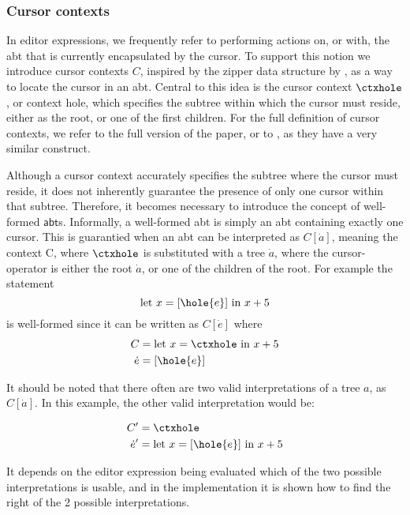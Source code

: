\documentclass[sigplan,review]{acmart}
\newcommand{\abt}{\textsf{abt}\xspace}
\begin{document}
\subsubsection{Cursor contexts}
In editor expressions, we frequently refer to performing actions on, or with, the \abt that is currently encapsulated by the cursor. To support this notion we introduce cursor contexts $C$, inspired by the zipper data structure by \cite{huet_zipper}, as a way to locate the cursor in an \abt. Central to this idea is the cursor context $\ctxhole$, or context hole, which specifies the subtree within which the cursor must reside, either as the root, or one of the first children.  For the full definition of cursor contexts, we refer to the full version of the paper, or to \cite{type_safe_structure_editor}, as they have a very similar construct.

Although a cursor context accurately specifies the subtree where the cursor must reside, it does not inherently guarantee the presence of only one cursor within that subtree. Therefore, it becomes necessary to introduce the concept of well-formed $\abt$s. Informally, a well-formed \abt is simply an \abt containing exactly one cursor. This is guarantied when an \abt can be interpreted as $C[\dot{a}]$, meaning the context C, where $\ctxhole$ is substituted with a tree $\dot{a}$, where the cursor-operator is either the root $\dot{a}$, or one of the children of the root. For example the statement
    \begin{equation*}
        \text{let $x=[\hole{e}]$ in $x+5$}
    \end{equation*}
    is well-formed since it can be written as $C[\dot{e}]$ where
    \begin{align*}
        C &= \text{let $x=\ctxhole$ in $x+5$} \\
        \dot{e}&= [\hole{e}]
    \end{align*}


It should be noted that there often are two valid interpretations of a tree $a$, as $C[\dot{a}]$. In this example, the other valid interpretation would be:

\begin{align*}
        C' &= \ctxhole \\
        \dot{e}' &= \text{let $x=[\hole{e}]$ in $x+5$}
\end{align*}

It depends on the editor expression being evaluated which of the two possible interpretations is usable, and in the implementation it is shown how to find the right of the 2 possible interpretations.
\end{document}
